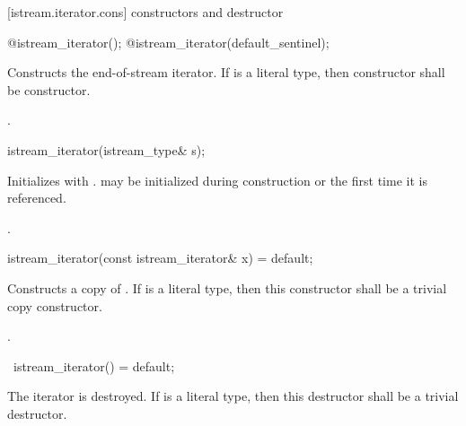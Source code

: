 [istream.iterator.cons]{ constructors and destructor}

%
\begin{itemdecl}
@\seebelow@ istream_iterator();
@\seebelow@ istream_iterator(default_sentinel);
\end{itemdecl}

\begin{itemdescr}
\pnum
\effects
Constructs the end-of-stream iterator. If  is a literal type, then 
constructor shall be  constructor.

\pnum
\postcondition {}.
\end{itemdescr}

%
\begin{itemdecl}
istream_iterator(istream_type& s);
\end{itemdecl}

\begin{itemdescr}
\pnum
\effects
Initializes  with .  may be initialized during
construction or the first time it is referenced.

\pnum
\postcondition {}.
\end{itemdescr}

%
\begin{itemdecl}
istream_iterator(const istream_iterator& x) = default;
\end{itemdecl}

\begin{itemdescr}
\pnum
\effects
Constructs a copy of . If  is a literal type, then this constructor shall be a trivial copy constructor.

\pnum
\postcondition {}.
\end{itemdescr}

%
\begin{itemdecl}
~istream_iterator() = default;
\end{itemdecl}

\begin{itemdescr}
\pnum
\effects
The iterator is destroyed. If  is a literal type, then this destructor shall be a trivial destructor.
\end{itemdescr}

